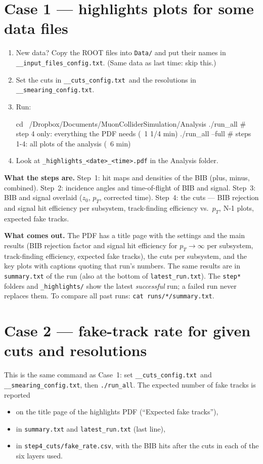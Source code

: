 \documentclass[11pt,letterpaper]{article}
\newcommand{\code}[1]{\texttt{#1}}
\newcommand{\pT}{\ensuremath{p_T}}
\newcommand{\cuts}{\code{\_\_cuts\_config.txt}}
\newcommand{\smear}{\code{\_\_smearing\_config.txt}}
\newcommand{\inputs}{\code{\_\_input\_files\_config.txt}}
\begin{document}
\section{Case 1 --- highlights plots for some data files}\label{sec:highlights}
\begin{enumerate}[leftmargin=1.5em]
\item New data? Copy the ROOT files into \code{Data/} and put their names
  in \inputs. (Same data as last time: skip this.)
\item Set the cuts in \cuts\ and the resolutions in \smear.
\item Run:
\begin{shell}
cd ~/Dropbox/Documents/MuonColliderSimulation/Analysis
./run_all            # step 4 only: everything the PDF needs  (~1 1/4 min)
./run_all --full     # steps 1-4: all plots of the analysis   (~6 min)
\end{shell}
\item Look at \code{\_highlights\_<date>\_<time>.pdf} in the Analysis folder.
\end{enumerate}

\textbf{What the steps are.} Step~1: hit maps and densities of the BIB
(plus, minus, combined). Step~2: incidence angles and time-of-flight of BIB
and signal. Step~3: BIB and signal overlaid ($z_0$, \pT, corrected time).
Step~4: the cuts --- BIB rejection and signal hit efficiency per
subsystem, track-finding efficiency vs.\ \pT, N-1 plots, expected fake tracks.

\textbf{What comes out.} The PDF has a title page with the settings and the
main results (BIB rejection factor and signal hit efficiency for
$\pT\to\infty$ per subsystem, track-finding efficiency, expected fake
tracks), the cuts per subsystem, and the key plots with captions quoting
that run's numbers. The same results are in \code{summary.txt} of the run
(also at the bottom of \code{latest\_run.txt}). The \code{step*} folders and
\code{\_highlights/} show the latest \emph{successful} run; a failed run
never replaces them. To compare all past runs: \code{cat runs/*/summary.txt}.

\section{Case 2 --- fake-track rate for given cuts and resolutions}\label{sec:fakes}
This is the same command as Case~1: set \cuts\ and \smear, then
\code{./run\_all}. The expected number of fake tracks is reported
\begin{itemize}[leftmargin=1.2em]
\item on the title page of the highlights PDF (``Expected fake tracks''),
\item in \code{summary.txt} and \code{latest\_run.txt} (last line),
\item in \code{step4\_cuts/fake\_rate.csv}, with the BIB hits after the cuts
  in each of the six layers used.
\end{itemize}
\end{document}

